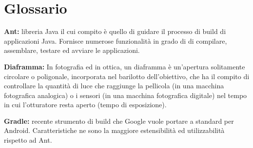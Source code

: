 
\newpage
\chapter{Glossario} %
\renewcommand{\chaptername}{MyChapter}
\label{AppendixA} %


\textbf{Ant:} libreria Java il cui compito è quello di guidare il processo di build di applicazioni Java. Fornisce numerose funzionalità in grado di di compilare, assemblare, testare ed avviare le applicazioni.


\textbf{Diaframma:} In fotografia ed in ottica, un diaframma è un'apertura solitamente circolare o poligonale, incorporata nel barilotto dell'obiettivo, che ha il compito di controllare la quantità di luce che raggiunge la pellicola (in una macchina fotografica analogica) o i sensori (in una macchina fotografica digitale) nel tempo in cui l'otturatore resta aperto (tempo di esposizione).

\textbf{Gradle:} recente strumento di build che Google vuole portare a standard per Android. Caratteristiche ne sono la maggiore estensibilità ed utilizzabilità rispetto ad Ant.

